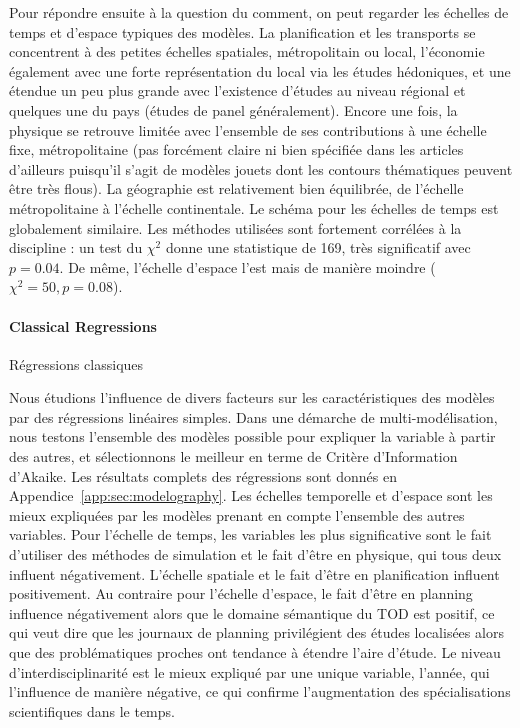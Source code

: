 Pour répondre ensuite à la question du comment, on peut regarder les échelles de temps et d'espace typiques des modèles. La planification et les transports se concentrent à des petites échelles spatiales, métropolitain ou local, l'économie également avec une forte représentation du local via les études hédoniques, et une étendue un peu plus grande avec l'existence d'études au niveau régional et quelques une du pays (études de panel généralement). Encore une fois, la physique se retrouve limitée avec l'ensemble de ses contributions à une échelle fixe, métropolitaine (pas forcément claire ni bien spécifiée dans les articles d'ailleurs puisqu'il s'agit de modèles jouets dont les contours thématiques peuvent être très flous). La géographie est relativement bien équilibrée, de l'échelle métropolitaine à l'échelle continentale. Le schéma pour les échelles de temps est globalement similaire. Les méthodes utilisées sont fortement corrélées à la discipline : un test du $\chi^2$ donne une statistique de 169, très significatif avec $p=0.04$. De même, l'échelle d'espace l'est mais de manière moindre ($\chi^2 = 50, p = 0.08$).


\paragraph{Classical Regressions}{Régressions classiques}

Nous étudions l'influence de divers facteurs sur les caractéristiques des modèles par des régressions linéaires simples. Dans une démarche de multi-modélisation, nous testons l'ensemble des modèles possible pour expliquer la variable à partir des autres, et sélectionnons le meilleur en terme de Critère d'Information d'Akaike. Les résultats complets des régressions sont donnés en Appendice~\ref{app:sec:modelography}. Les échelles temporelle et d'espace sont les mieux expliquées par les modèles prenant en compte l'ensemble des autres variables. Pour l'échelle de temps, les variables les plus significative sont le fait d'utiliser des méthodes de simulation et le fait d'être en physique, qui tous deux influent négativement. L'échelle spatiale et le fait d'être en planification influent positivement. Au contraire pour l'échelle d'espace, le fait d'être en planning influence négativement alors que le domaine sémantique du TOD est positif, ce qui veut dire que les journaux de planning privilégient des études localisées alors que des problématiques proches ont tendance à étendre l'aire d'étude. Le niveau d'interdisciplinarité est le mieux expliqué par une unique variable, l'année, qui l'influence de manière négative, ce qui confirme l'augmentation des spécialisations scientifiques dans le temps. 




